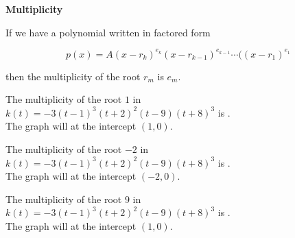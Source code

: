 \documentclass{ximera}
\author{Lee Wayand}
\begin{document}
\begin{exercise}






\begin{idea} \textbf{\textcolor{blue!55!black}{Multiplicity}}


If we have a polynomial written in factored form

\[
p(x) = A (x-r_k)^{e_k} (x-r_{k-1})^{e_{k-1}}  \cdots ((x-r_1)^{e_1}
\]

then the multiplicity of the root $r_m$ is $e_m$. \\





\end{idea}









\begin{question}



The multiplicity of the root $1$ in $k(t) = -3(t - 1)^3 (t + 2)^2 (t - 9) (t + 8)^3$ is . \\



The graph will  at the intercept $(1, 0)$.


\end{question}











\begin{question}



The multiplicity of the root $-2$ in $k(t) = -3(t - 1)^3 (t + 2)^2 (t - 9) (t + 8)^3$ is . \\



The graph will  at the intercept $(-2, 0)$.


\end{question}











\begin{question}



The multiplicity of the root $9$ in $k(t) = -3(t - 1)^3 (t + 2)^2 (t - 9) (t + 8)^3$ is . \\



The graph will  at the intercept $(1, 0)$.


\end{question}














\end{exercise}
\end{document}
